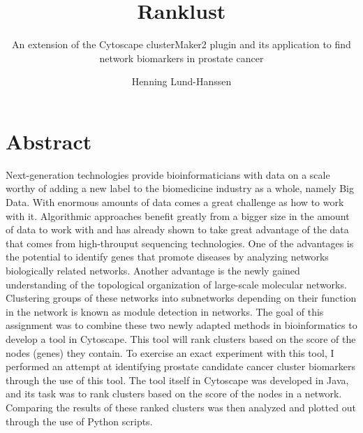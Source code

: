 \documentclass[a4paper,UKenglish]{ifimaster}
\title{Ranklust}
\subtitle{An extension of the Cytoscape clusterMaker2 plugin and its application
to find network biomarkers in prostate cancer}
\author{Henning Lund-Hanssen}
\begin{document}
\duoforside[program={Programming and Networks},
    dept={Department of Informatics},long]

\frontmatter{}

\setlength{\parskip}{12pt}
\setlength{\parindent}{12pt}

\chapter*{Abstract}
Next-generation technologies provide bioinformaticians with data on a scale
worthy of adding a new label to the biomedicine industry as a whole, namely
Big Data. With enormous amounts of data comes a great challenge as how to work
with it. Algorithmic approaches benefit greatly from a bigger size in the amount
of data to work with and has already shown to take great advantage of the data
that comes from high-throuput sequencing technologies. One of the advantages is
the potential to identify genes that promote diseases by analyzing networks
biologically related networks. Another advantage is the newly gained
understanding of the topological organization of large-scale molecular networks.
Clustering groups of these networks into subnetworks depending on their function
in the network is known as module detection in networks. The goal of this
assignment was to combine these two newly adapted methods in bioinformatics to
develop a tool in Cytoscape. This tool will rank clusters based on the score of
the nodes (genes) they contain. To exercise an exact experiment with this tool,
I performed an attempt at identifying prostate candidate cancer cluster
biomarkers through the use of this tool. The tool itself in Cytoscape was
developed in Java, and its task was to rank clusters based on the score of the
nodes in a network. Comparing the results of these ranked clusters was then
analyzed and plotted out through the use of Python scripts.


\tableofcontents{}
\listoffigures{}
\listoftables{}
\lstlistoflistings

\mainmatter{}







\backmatter{}
\printglossaries
\printbibliography
\end{document}

